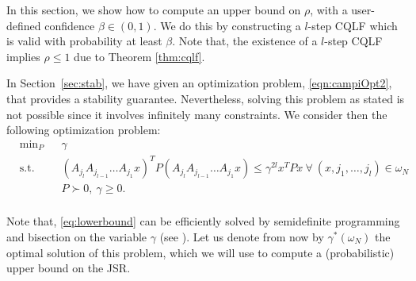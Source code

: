 In this section, we show how to compute an upper bound on $\rho$, with a user-defined confidence $\beta \in (0, 1)$. We do this by constructing a $l$-step CQLF which is valid with probability at least $\beta$. Note that, the existence of a $l$-step CQLF implies $\rho \leq 1$ due to Theorem \ref{thm:cqlf}.

In Section~\ref{sec:stab}, we have given an optimization problem, \eqref{eqn:campiOpt2}, that provides a stability guarantee. Nevertheless, solving this problem as stated is not possible since it involves infinitely many constraints. We consider then the following optimization problem:
\begin{equation}\label{eq:lowerbound}
\begin{aligned}
& \text{min}_P & & \gamma \\
& \text{s.t.} 
&  & (A_{j_l} A_{j_{l-1}} \dots A_{j_1} x)^T P (A_{j_l} A_{j_{l-1}} \dots A_{j_1} x) \leq \gamma^{2l} x^T P x \  \forall\ (x, j_1,\dots, j_l) \in \omega_N\\
& && P \succ 0,\ \gamma \geq 0. \\
\end{aligned}
\end{equation}

Note that, \eqref{eq:lowerbound} can be efficiently solved by semidefinite programming and bisection on the variable $\gamma$ (see \cite{boyd}). Let us denote from now by $\gamma^*(\omega_N)$ the optimal solution of this problem, which we will use to compute a (probabilistic) upper bound on the JSR.







